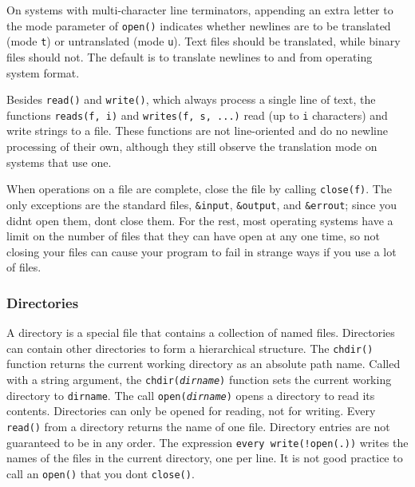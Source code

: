 On systems with multi-character line terminators, appending an
extra letter to the mode parameter of \texttt{open()} indicates whether
newlines are to be translated (mode
\texttt{{\textquotedbl}t{\textquotedbl}}) or untranslated (mode
\texttt{{\textquotedbl}u{\textquotedbl}}). Text files should
be translated, while binary files should not. The default is to translate
newlines to and from operating system format.

Besides \texttt{read()} and \texttt{write()}, which always process a
single line of text, the functions \texttt{reads(f, i)} and
\texttt{writes(f, s, ...)} read (up to \texttt{i} characters) and write
strings to a file. These functions are not line-oriented and do no
newline processing of their own, although they still observe the
translation mode on systems that use one.

When operations on a file are complete, close the file by calling
\texttt{close(f)}. The only exceptions are the standard
files, \texttt{\&input}, \texttt{\&output}, and \texttt{\&errout};
since you didn{\textquotesingle}t open them, don{\textquotesingle}t
close them. For the rest, most operating systems have a limit on the
number of files that they can have open at any one time, so not closing
your files can cause your program to fail in strange ways if you use a
lot of files.

\subsubsection{Directories}

A directory is a special file that contains a
collection of named files. Directories can contain other directories to
form a hierarchical structure. The \texttt{chdir()}
function returns the current working directory as an absolute path
name. Called with a string argument, the
\texttt{chdir(}\texttt{\textit{dirname}}\texttt{)} function sets the
current working directory to \texttt{dirname}. The call
\texttt{open(}\texttt{\textit{dirname}}\texttt{)} opens a directory to
read its contents. Directories can only be opened for reading,
not for writing. Every \texttt{read()} from a directory returns
the name of one file. Directory entries are not guaranteed to be in any
order. The expression \texttt{every
write(!open({\textquotedbl}.{\textquotedbl}))} writes the names of the
files in the current directory, one per line. It is not good practice
to call an \texttt{open()} that you don{\textquotesingle}t
\texttt{close()}.

